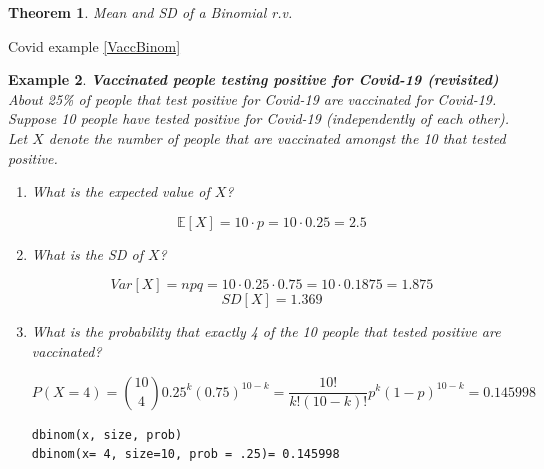 \documentclass[12pt]{amsart}
\newtheorem{theorem}{Theorem}[section]
\newtheorem{example}[theorem]{Example}
\begin{document}
{\begin{theorem}{Mean and SD of a Binomial r.v.}
\end{theorem}


\color{blue}
Covid example \ref{VaccBinom}
\color{black}



\newpage
\begin{example}\label{VaccBinom10}  \textbf{Vaccinated people testing positive for Covid-19 (revisited)} \newline
About 25\% of people that test positive for Covid-19 are vaccinated for Covid-19.\newline
Suppose 10 people have tested positive for Covid-19 (independently of each other). \newline
Let $X$ denote the number of people that are vaccinated amongst the 10 that tested positive.

\begin{enumerate}


\item What is the expected value of $X$?

\vspace{1.5cm}
\color{blue}
$$\mathbb{E}[X] = 10\cdot p = 10\cdot0.25 = 2.5$$
\color{black}

\item What is the SD of $X$?

\vspace{2cm}
\color{blue}
$$Var[X] = npq = 10\cdot0.25\cdot0.75 = 10\cdot0.1875 = 1.875$$
$$SD[X] = 1.369$$

\color{black}





\item What is the probability that exactly 4 of the 10 people that tested positive are vaccinated?

\color{blue}
$$
P(X = 4) = {10\choose 4}0.25^k(0.75)^{10-k} = \frac{10!}{k!(10-k)!}p^k(1-p)^{10-k} = 0.145998
$$
\vspace{1cm}
\begin{verbatim}
dbinom(x, size, prob) 
dbinom(x= 4, size=10, prob = .25)= 0.145998
\end{verbatim}
\color{black}

\vspace{5cm}


\newpage



\end{enumerate}
\end{example}}
\end{document}
